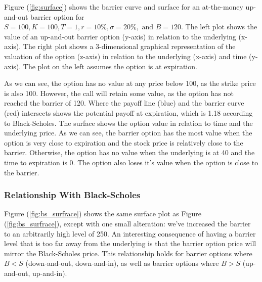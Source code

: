 Figure (\ref{fig:surface}) shows the barrier curve and surface for an at-the-money up-and-out barrier option for $S=100,K=100, T=1, r=10\%,\sigma=20\%, \text{ and }B=120$. The left plot shows the value of an up-and-out barrier option (y-axis) in relation to the underlying (x-axis). The right plot shows a 3-dimensional graphical representation of the valuation of the option (z-axis) in relation to the underlying (x-axis) and time (y-axis). The plot on the left assumes the option is at expiration.

As we can see, the option has no value at any price below 100, as the strike price is also 100. However, the call will retain some value, as the option has not reached the barrier of 120. Where the payoff line (blue) and the barrier curve (red) intersects shows the potential payoff at expiration, which is 1.18 according to Black-Scholes. The surface shows the option value in relation to time and the underlying price. As we can see, the barrier option has the most value when the option is very close to expiration and the stock price is relatively close to the barrier. Otherwise, the option has no value when the underlying is at 40 and the time to expiration is 0. The option also loses it's value when the option is close to the barrier.

\subsubsection{Relationship With Black-Scholes}
Figure (\ref{fig:bs_surfrace}) shows the same surface plot as Figure (\ref{fig:bs_surfrace}), except with one small alteration: we've increased the barrier to an arbitrarily high level of 250. An interesting consequence of having a barrier level that is too far away from the underlying is that the barrier option price will mirror the Black-Scholes price. This relationship holds for barrier options where $B<S$ (down-and-out, down-and-in), as well as barrier options where $B>S$ (up-and-out, up-and-in).

